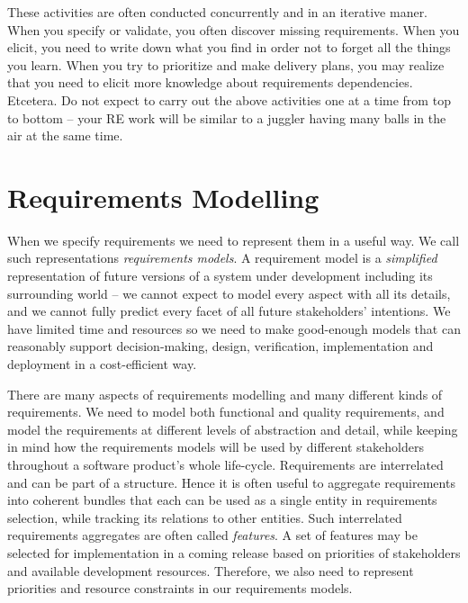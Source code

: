 These activities are often conducted concurrently and in an iterative maner. When you specify or validate, you often discover missing requirements. When you elicit, you need to write down what you find in order not to forget all the things you learn. When you try to prioritize and make delivery plans, you may realize that you need to elicit more knowledge about requirements dependencies. Etcetera. Do not expect to carry out the above activities one at a time from top to bottom -- your RE work will be similar to a juggler having many balls in the air at the same time. 
\section{Requirements Modelling}

When we specify requirements we need to represent them in a useful way. We call such representations \textit{requirements models}. A requirement model is a \emph{simplified} representation of future versions of a system under development including its surrounding world -- we cannot expect to model every aspect with all its details, and we cannot fully predict every facet of all future stakeholders' intentions. We have limited time and resources so we need to make good-enough models that can reasonably support decision-making, design, verification, implementation and deployment in a cost-efficient way.

There are many aspects of requirements modelling and many different kinds of requirements. We need to model both functional and quality requirements, and model the requirements at different levels of abstraction and detail, while keeping in mind how the requirements models will be used by different stakeholders throughout a software product's whole life-cycle. Requirements are interrelated and can be part of a structure. Hence it is often useful to aggregate requirements into coherent bundles that each can be used as a single entity in requirements selection, while tracking its relations to other entities. Such interrelated requirements aggregates are often called \emph{features}. A set of features may be selected for implementation in a coming release based on priorities of stakeholders and available development resources. Therefore, we also need to represent priorities and resource constraints in our requirements models.

